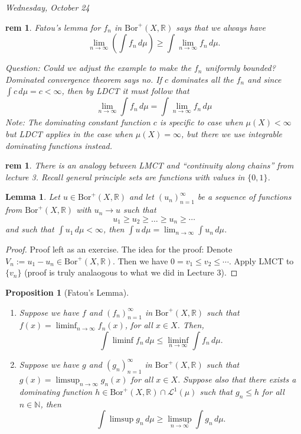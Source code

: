 \documentclass[letterpaper, 12pt]{article}
\newcommand{\fin}{\qquad \quad \hfill \framebox[1.75mm][l]{\,}}
\newcommand{\cL}{\mathcal{L}}
\newcommand{\bR}{\mathbb{R}}
\newcommand{\bN}{\mathbb{N}}
\newcommand{\Bor}{\mathrm{Bor}}
\theoremstyle{stdthm}
\newtheorem{lem}[thm]{Lemma}
\newtheorem{prop}[thm]{Proposition}
\theoremstyle{stddef}
\newtheorem{rem}[thm]{rem} %
\theoremstyle{stdnonum}
\theoremstyle{stdqands}
\theoremstyle{stdbold}
\begin{document}
\begin{center}
\emph{Wednesday, October 24}
\end{center}

\begin{rem}
Fatou's lemma for $f_n$ in $\Bor^+(X,\bR)$ says that we always have 
\[
\lim_{n\rightarrow \infty }\left( \int f_n \, d\mu\right) \geq \int \lim_{n\rightarrow \infty} f_n \, d\mu.
\]

\noindent Question: Could we adjust the example to make the $f_n$ uniformly bounded? Dominated convergence theorem says no. If $c$ dominates all the $f_n$ and since $\int c \, d\mu = c < \infty$, then by LDCT it must follow that 
\[
\lim_{n\rightarrow \infty} \int f_n \, d\mu = \int \lim_{n\rightarrow \infty} f_n \, d\mu
\]
Note: The dominating constant function $c$ is specific to case when $\mu(X) <\infty$ but LDCT applies in the case when $\mu(X) = \infty$, but there we use integrable dominating functions instead. 
\end{rem}

\begin{rem}
There is an analogy between LMCT and ``continuity along chains'' from lecture 3. Recall general principle sets are functions with values in $\{0,1\}$. 
\end{rem}

\begin{lem}
Let $u\in\Bor^+(X,\bR)$ and let $(u_n)_{n=1}^\infty$ be a sequence of functions from $\Bor^+(X,\bR)$ with $u_n\to u$ such that 
\[
u_1 \geq u_2 \geq \dots \geq u_n \geq \cdots
\]
and such that $\int u_1 \, d\mu < \infty$, then $\int u \, d\mu = \lim_{n\rightarrow \infty} \int u_n \, d\mu$.
\end{lem}

\begin{proof}
Proof left as an exercise. The idea for the proof: Denote $V_n := u_1 - u_n \in \Bor^+(X,\bR)$. Then we have $0 = v_1 \leq v_2 \leq \cdots $. Apply LMCT to $\{v_n\}$ (proof is truly analaogous to what we did in Lecture 3). 
\end{proof}
\newpage
\begin{prop}[Fatou's Lemma] $ $
\begin{enumerate}
\item Suppose we have $f$ and $(f_n)_{n=1}^\infty$ in $\Bor^+(X,\bR)$ such that $f(x) = \liminf_{n\rightarrow \infty} f_n(x)$, for all $x \in X$.
Then,
\[ \int \liminf f_n \, d\mu \leq \liminf_{n\rightarrow \infty} \int f_n\, d\mu.
\]

\item Suppose we have $g$ and $(g_n)_{n=1}^\infty$ in $\Bor^+(X,\bR)$ such that $g(x) =\limsup_{n\rightarrow \infty} g_n(x)$ for all $x \in X$. Suppose also that there exists a dominating function $h \in \Bor^+(X,\bR) \cap \cL^1 (\mu)$ such that $g_n \leq h$ for all $n \in \bN$, then 
\[
\int \limsup g_n \, d\mu \geq \limsup_{n\rightarrow \infty} \int g_n \, d\mu.
\]
\end{enumerate}
\end{prop}
\end{document}
